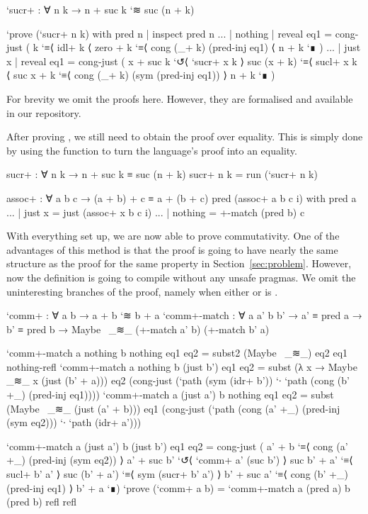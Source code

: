 \begin{code}
`sucr+ : ∀ n k → n + suc k `≋ suc (n + k)
\end{code}
\begin{code}[hide]
`prove (`sucr+ n k) with pred n | inspect pred n
... | nothing | reveal eq1 = cong-just (
  k
    `≡⟨ idl+ k ⟨
  zero + k
    `≡⟨ cong (_+ k) (pred-inj eq1) ⟨
  n + k `∎
  )
... | just x  | reveal eq1 = cong-just (
  x + suc k
    `↺⟨ `sucr+ x k ⟩
  suc (x + k)
    `≡⟨ sucl+ x k ⟨
  suc x + k
    `≡⟨ cong (_+ k) (sym (pred-inj eq1)) ⟩
  n + k `∎
  )
\end{code}

For brevity we omit the proofs here. However, they are formalised and available in our repository.

After proving , we still need to obtain the proof over equality.
This is simply done by using the  function to turn the language's proof
into an equality.

\begin{code}
sucr+ : ∀ n k → n + suc k ≡ suc (n + k)
sucr+ n k = run (`sucr+ n k)
\end{code}
\begin{code}[hide]
assoc+ : ∀ a b c → (a + b) + c ≡ a + (b + c)
pred (assoc+ a b c i) with pred a
... | just x = just (assoc+ x b c i)
... | nothing = +-match (pred b) c
\end{code}

With everything set up, we are now able to prove commutativity. One of the advantages
of this method is that the proof is going to have nearly the same structure as the proof
for the same property in Section~\ref{sec:problem}. However, now the definition is going to
compile without any unsafe pragmas. We omit the uninteresting branches of the proof, namely when either
 or  is .

\begin{code}
`comm+ : ∀ a b → a + b `≋ b + a
`comm+-match :
  ∀ a a' b b' → a' ≡ pred a → b' ≡ pred b →
  Maybe~ _≋_ (+-match a' b) (+-match b' a)
\end{code}
\begin{code}[hide]
`comm+-match a nothing b nothing eq1 eq2 = subst2 (Maybe~ _≋_) eq2 eq1 nothing-refl
`comm+-match a nothing b (just b') eq1 eq2 = subst (λ x → Maybe~ _≋_ x (just (b' + a))) eq2 (cong-just (`path (sym (idr+ b')) `∙ `path (cong (b' +_) (pred-inj eq1))))
`comm+-match a (just a') b nothing eq1 eq2 = subst (Maybe~ _≋_ (just (a' + b))) eq1 (cong-just (`path (cong (a' +_) (pred-inj (sym eq2))) `∙ `path (idr+ a')))
\end{code}
\begin{code}
`comm+-match a (just a') b (just b') eq1 eq2 =
  cong-just
    ( a' + b         `≡⟨ cong (a' +_) (pred-inj (sym eq2)) ⟩
      a' + suc b'    `↺⟨ `comm+ a' (suc b') ⟩
      suc b' + a'    `≡⟨ sucl+ b' a' ⟩
      suc (b' + a')  `≡⟨ sym (sucr+ b' a') ⟩
      b' + suc a'    `≡⟨ cong (b' +_) (pred-inj eq1) ⟩
      b' + a `∎)
`prove (`comm+ a b) =
  `comm+-match a (pred a) b (pred b) refl refl
\end{code}

